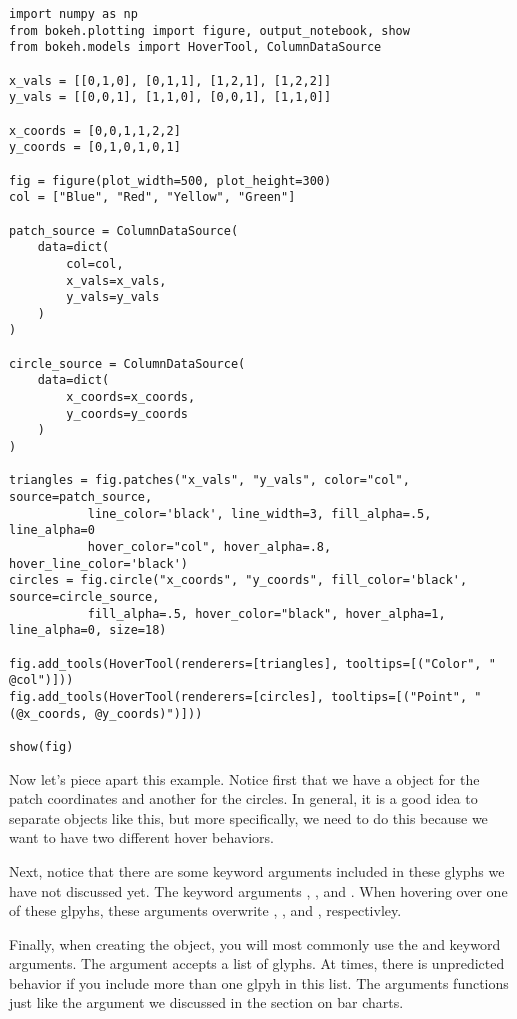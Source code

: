\begin{lstlisting}
import numpy as np
from bokeh.plotting import figure, output_notebook, show
from bokeh.models import HoverTool, ColumnDataSource

x_vals = [[0,1,0], [0,1,1], [1,2,1], [1,2,2]]
y_vals = [[0,0,1], [1,1,0], [0,0,1], [1,1,0]]

x_coords = [0,0,1,1,2,2]
y_coords = [0,1,0,1,0,1]

fig = figure(plot_width=500, plot_height=300)
col = ["Blue", "Red", "Yellow", "Green"]

patch_source = ColumnDataSource(
    data=dict(
        col=col,
        x_vals=x_vals,
        y_vals=y_vals
    )
)

circle_source = ColumnDataSource(
    data=dict(
        x_coords=x_coords,
        y_coords=y_coords
    )
)

triangles = fig.patches("x_vals", "y_vals", color="col", source=patch_source,
           line_color='black', line_width=3, fill_alpha=.5, line_alpha=0
           hover_color="col", hover_alpha=.8, hover_line_color='black')
circles = fig.circle("x_coords", "y_coords", fill_color='black', source=circle_source,
           fill_alpha=.5, hover_color="black", hover_alpha=1, line_alpha=0, size=18)

fig.add_tools(HoverTool(renderers=[triangles], tooltips=[("Color", " @col")]))
fig.add_tools(HoverTool(renderers=[circles], tooltips=[("Point", " (@x_coords, @y_coords)")]))

show(fig)
\end{lstlisting}

Now let's piece apart this example. Notice first that we have a
 object for the patch coordinates and another
 for the circles. In general, it is a good idea to separate
 objects like this, but more specifically, we need to do this
because we want to have two different hover behaviors.

Next, notice that there are some keyword arguments included in these glyphs we
have not discussed yet. The keyword arguments , ,
and . When hovering over one of these glpyhs, these arguments
overwrite , , and , respectivley.

Finally, when creating the  object, you will most commonly use
the  and  keyword arguments. The 
argument accepts a list of glyphs. At times, there is unpredicted behavior if you
include more than one glpyh in this list. The  arguments functions
just like the  argument we discussed in the section on bar charts.


